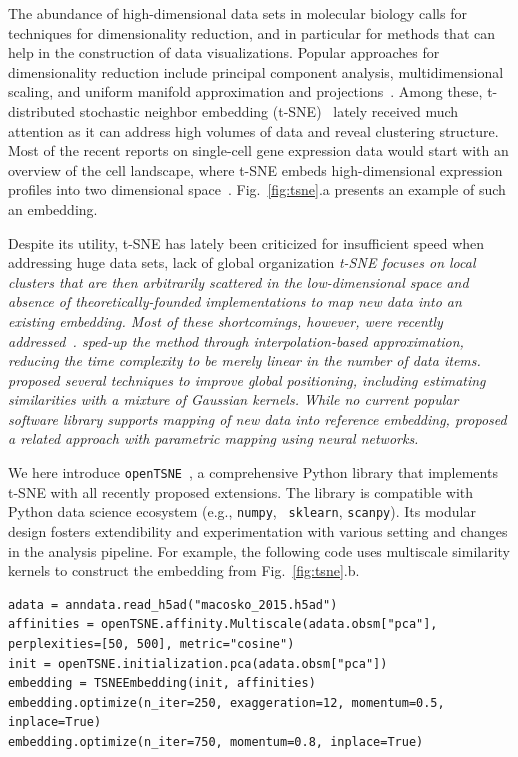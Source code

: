 \documentclass{bioinfo}
\newcommand{\opentsne}[0]{{\tt openTSNE}\ }
\begin{document}
The abundance of high-dimensional data sets in molecular biology calls for
techniques for dimensionality reduction, and in particular for methods that can
help in the construction of data visualizations. Popular approaches for
dimensionality reduction include principal component analysis, multidimensional
scaling, and uniform manifold approximation and projections~\citep{}. Among
these, t-distributed stochastic neighbor embedding
(t-SNE)~\citep{tsne,review-tsne} lately received much attention as it can
address high volumes of data and reveal clustering structure. Most
of the recent reports on single-cell gene expression data would start with an
overview of the cell landscape, where t-SNE embeds high-dimensional expression
profiles into two dimensional space~\citep{Macosko2015, Shekhar2016,three}.
Fig.~\ref{fig:tsne}.a presents an example of such an embedding.

Despite its utility, t-SNE has lately been criticized for insufficient speed
when addressing huge data sets, lack of global organization \em t-SNE
focuses on local clusters that are then arbitrarily scattered in the
low-dimensional space \em and absence of theoretically-founded implementations to
map new data into an existing embedding. Most of these shortcomings, however, were
recently addressed~\citep{ding2018interpretable,becht2019dimensionality}.
\citet{fi_tsne} sped-up the method through interpolation-based
approximation, reducing the time complexity to be merely linear
in the number of data items. \citet{art_of_using_tsne} proposed
several techniques to improve global positioning, including estimating similarities with a mixture of
Gaussian kernels. While no current popular
software library supports mapping of new data into reference embedding,
\citet{parametric_tsne} proposed a related approach with parametric mapping
using neural networks.

We here introduce \opentsne, a comprehensive Python library that
implements t-SNE with all recently proposed extensions. The library is
compatible with Python data science ecosystem (e.g., {\tt numpy}, {\tt
sklearn}, {\tt scanpy}). Its modular design fosters extendibility and
experimentation with various setting and changes in the analysis pipeline. For
example, the following code uses multiscale similarity kernels to construct the
embedding from Fig.~\ref{fig:tsne}.b.

\begin{lstlisting}
adata = anndata.read_h5ad("macosko_2015.h5ad")
affinities = openTSNE.affinity.Multiscale(adata.obsm["pca"], perplexities=[50, 500], metric="cosine")
init = openTSNE.initialization.pca(adata.obsm["pca"])
embedding = TSNEEmbedding(init, affinities)
embedding.optimize(n_iter=250, exaggeration=12, momentum=0.5, inplace=True)
embedding.optimize(n_iter=750, momentum=0.8, inplace=True)
\end{lstlisting}
\end{document}
